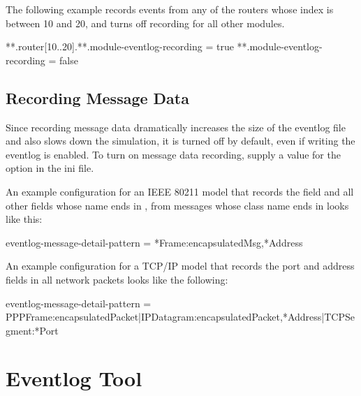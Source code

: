 The following example records events from any of the routers whose index is
between 10 and 20, and turns off recording for all other modules.

\begin{inifile}
**.router[10..20].**.module-eventlog-recording = true
**.module-eventlog-recording = false
\end{inifile}

\subsection{Recording Message Data}
\label{sec:eventlog:recording-messages}

Since recording message data dramatically increases the size of the
eventlog file and also slows down the simulation, it is turned off by
default, even if writing the eventlog is enabled. To turn on message data
recording, supply a value for the 
option in the ini file.



An example configuration for an IEEE 80211 model that records the  field
and all other fields whose name ends in , from messages whose class name ends in
 looks like this:

\begin{inifile}
eventlog-message-detail-pattern = *Frame:encapsulatedMsg,*Address
\end{inifile}

An example configuration for a TCP/IP model that records the port and address
fields in all network packets looks like the following:

\begin{inifile}
eventlog-message-detail-pattern =
 PPPFrame:encapsulatedPacket|IPDatagram:encapsulatedPacket,*Address|TCPSegment:*Port
\end{inifile}

%


\section{Eventlog Tool}
\label{sec:eventlog:eventlog-tool}

